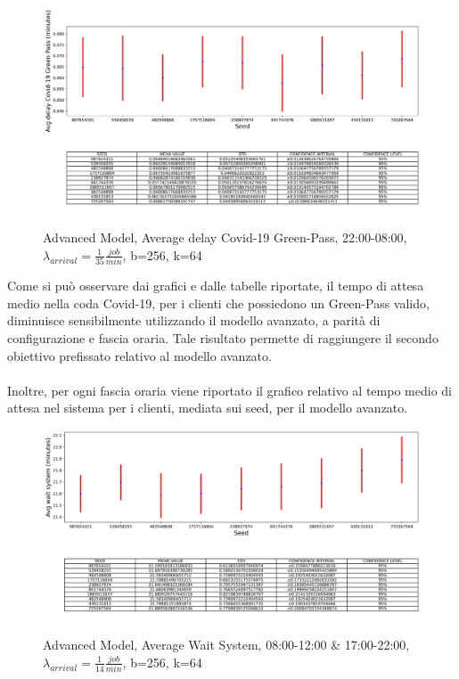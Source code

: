 \documentclass{article}
\begin{document}
\begin{figure}[H]
	\centering
	\captionsetup{justification=centering,margin=2cm}
	\includegraphics[scale=0.48]{images/adv_avg_d_covid_steady_state_night.png}
	\caption{Advanced Model, Average delay Covid-19 Green-Pass, 22:00-08:00, $\lambda_{arrival}=\frac{1}{35} \frac{job}{min}$, b=256, k=64}\label{figura:adv_avg_d_covid_steady_state_night}
\end{figure}

Come si può osservare dai grafici e dalle tabelle riportate, il tempo di attesa medio nella coda Covid-19, per i clienti che possiedono un Green-Pass valido, diminuisce sensibilmente utilizzando il modello avanzato, a parità di configurazione e fascia oraria. Tale risultato permette di raggiungere il secondo obiettivo prefissato relativo al modello avanzato.
\\ \\
Inoltre, per ogni fascia oraria viene riportato il grafico relativo al tempo medio di attesa nel sistema per i clienti, mediata sui seed, per il modello avanzato.

\begin{figure}[H]
	\centering
	\captionsetup{justification=centering,margin=2cm}
	\includegraphics[scale=0.48]{images/adv_avg_ws_steady_state_mor.png}
	\caption{Advanced Model, Average Wait System, 08:00-12:00 \& 17:00-22:00, $\lambda_{arrival}=\frac{1}{14} \frac{job}{min}$, b=256, k=64}\label{figura:adv_avg_ws_steady_state_mor}
\end{figure}
\end{document}
